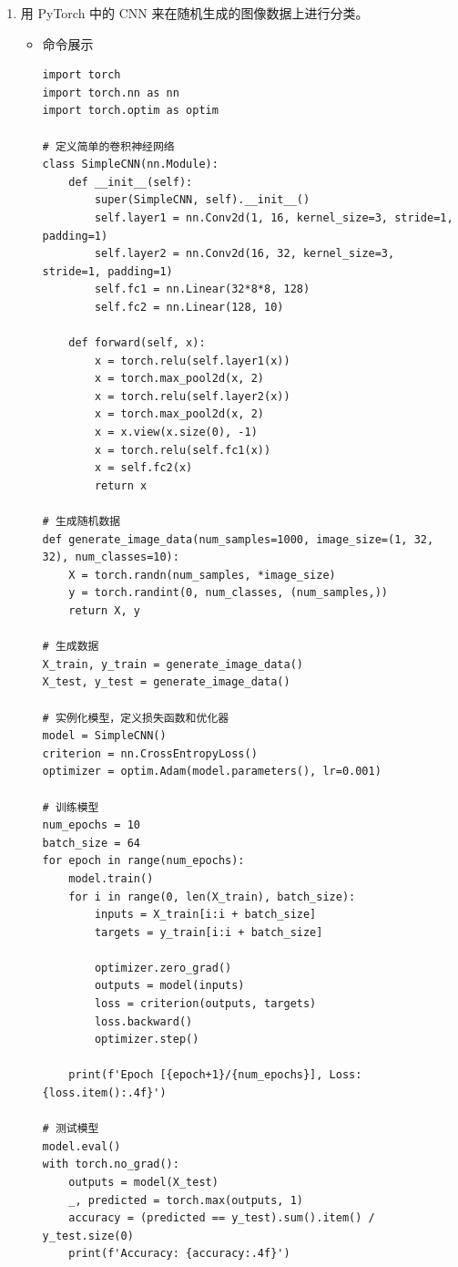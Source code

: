 \documentclass[UTF8]{ctexart}
\begin{document}
\begin{enumerate}
  \item 用 PyTorch 中的 CNN 来在随机生成的图像数据上进行分类。
  \begin{itemize}
  \item 命令展示
  \begin{verbatim}
import torch
import torch.nn as nn
import torch.optim as optim

# 定义简单的卷积神经网络
class SimpleCNN(nn.Module):
    def __init__(self):
        super(SimpleCNN, self).__init__()
        self.layer1 = nn.Conv2d(1, 16, kernel_size=3, stride=1, padding=1)
        self.layer2 = nn.Conv2d(16, 32, kernel_size=3, stride=1, padding=1)
        self.fc1 = nn.Linear(32*8*8, 128)
        self.fc2 = nn.Linear(128, 10)

    def forward(self, x):
        x = torch.relu(self.layer1(x))
        x = torch.max_pool2d(x, 2)
        x = torch.relu(self.layer2(x))
        x = torch.max_pool2d(x, 2)
        x = x.view(x.size(0), -1)
        x = torch.relu(self.fc1(x))
        x = self.fc2(x)
        return x

# 生成随机数据
def generate_image_data(num_samples=1000, image_size=(1, 32, 32), num_classes=10):
    X = torch.randn(num_samples, *image_size)
    y = torch.randint(0, num_classes, (num_samples,))
    return X, y

# 生成数据
X_train, y_train = generate_image_data()
X_test, y_test = generate_image_data()

# 实例化模型，定义损失函数和优化器
model = SimpleCNN()
criterion = nn.CrossEntropyLoss()
optimizer = optim.Adam(model.parameters(), lr=0.001)

# 训练模型
num_epochs = 10
batch_size = 64
for epoch in range(num_epochs):
    model.train()
    for i in range(0, len(X_train), batch_size):
        inputs = X_train[i:i + batch_size]
        targets = y_train[i:i + batch_size]

        optimizer.zero_grad()
        outputs = model(inputs)
        loss = criterion(outputs, targets)
        loss.backward()
        optimizer.step()

    print(f'Epoch [{epoch+1}/{num_epochs}], Loss: {loss.item():.4f}')

# 测试模型
model.eval()
with torch.no_grad():
    outputs = model(X_test)
    _, predicted = torch.max(outputs, 1)
    accuracy = (predicted == y_test).sum().item() / y_test.size(0)
    print(f'Accuracy: {accuracy:.4f}')

  \end{verbatim}


\end{itemize}
\end{enumerate}
\end{document}
